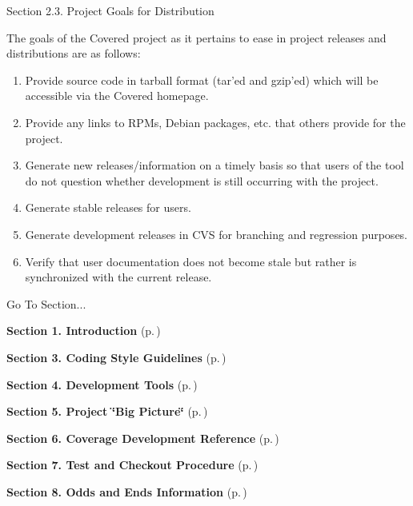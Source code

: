 \begin{Desc}
\item[Section 2.3.  Project Goals for Distribution]\par
 The goals of the Covered project as it pertains to ease in project releases and distributions are as follows:

\begin{enumerate}
\item 
Provide source code in tarball format (tar'ed and gzip'ed) which will be accessible via the Covered homepage.\item 
Provide any links to RPMs, Debian packages, etc. that others provide for the project.\item 
Generate new releases/information on a timely basis so that users of the tool do not  question whether development is still occurring with the project.\item 
Generate stable releases for users.\item 
Generate development releases in CVS for branching and regression purposes.\item 
Verify that user documentation does not become stale but rather is synchronized with the current release.\end{enumerate}
\end{Desc}


\begin{Desc}
\item[Go To Section...]\par
\begin{CompactItemize}
\item 
{\bf Section 1.  Introduction} {\rm (p.\,\pageref{page_intro})}\item 
{\bf Section 3.  Coding Style Guidelines} {\rm (p.\,\pageref{page_code_style})}\item 
{\bf Section 4.  Development Tools} {\rm (p.\,\pageref{page_tools})}\item 
{\bf Section 5.  Project \char`\"{}Big Picture\char`\"{}} {\rm (p.\,\pageref{page_big_picture})}\item 
{\bf Section 6.  Coverage Development Reference} {\rm (p.\,\pageref{page_code_details})}\item 
{\bf Section 7.  Test and Checkout Procedure} {\rm (p.\,\pageref{page_testing})}\item 
{\bf Section 8.  Odds and Ends Information} {\rm (p.\,\pageref{page_misc})}\end{CompactItemize}
\end{Desc}
